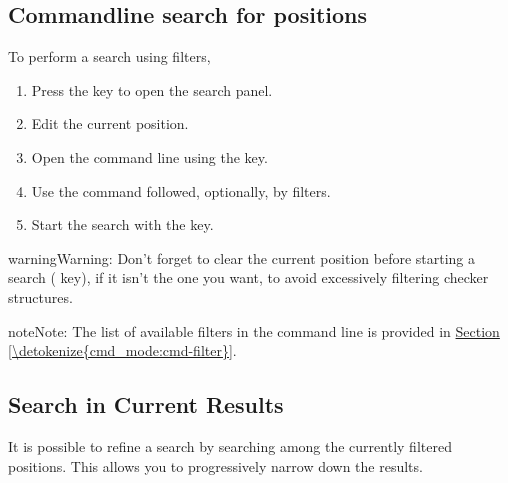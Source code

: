 \documentclass[letterpaper,10pt,english]{sphinxmanual}
\begin{document}
\subsection{Command\sphinxhyphen{}line search for positions}
\label{\detokenize{annexe_filtres:recherche-de-positions-en-ligne-de-commande}}
\sphinxAtStartPar
To perform a search using filters,
\begin{enumerate}
%
\item {} 
\sphinxAtStartPar
Press the  key to open the search panel.

\item {} 
\sphinxAtStartPar
Edit the current position.

\item {} 
\sphinxAtStartPar
Open the command line using the  key.

\item {} 
\sphinxAtStartPar
Use the command  followed, optionally, by filters.

\item {} 
\sphinxAtStartPar
Start the search with the  key.

\end{enumerate}

\begin{sphinxadmonition}{warning}{Warning:}
\sphinxAtStartPar
Don’t forget to clear the current position before starting a search ( key), if it isn’t the one you want, to avoid excessively filtering checker structures.
\end{sphinxadmonition}

\begin{sphinxadmonition}{note}{Note:}
\sphinxAtStartPar
The list of available filters in the command line is provided in \hyperref[\detokenize{cmd_mode:cmd-filter}]{Section \ref{\detokenize{cmd_mode:cmd-filter}}}.
\end{sphinxadmonition}


\subsection{Search in Current Results}
\label{\detokenize{annexe_filtres:recherche-dans-les-resultats-courants}}
\sphinxAtStartPar
It is possible to refine a search by searching among the currently filtered positions. This allows you to progressively narrow down the results.
\end{document}
